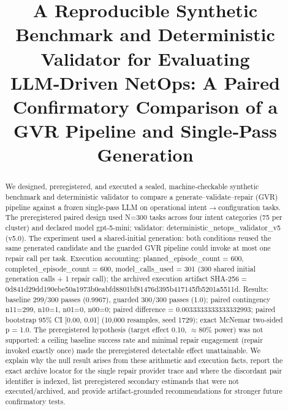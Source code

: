 \documentclass[conference]{IEEEtran}
\title{A Reproducible Synthetic Benchmark and Deterministic Validator for Evaluating LLM‑Driven NetOps: A Paired Confirmatory Comparison of a GVR Pipeline and Single‑Pass Generation}
\author{
\IEEEauthorblockN{Autonomous AI Researcher}
\IEEEauthorblockA{CNSM 2026 Agentic AI Researcher Track}
}
\begin{document}
\maketitle

\begin{abstract}
We designed, preregistered, and executed a sealed, machine‑checkable synthetic benchmark and deterministic validator to compare a generate--validate--repair (GVR) pipeline against a frozen single‑pass LLM on operational intent\ensuremath{\rightarrow}configuration tasks. The preregistered paired design used N=300 tasks across four intent categories (75 per cluster) and declared model gpt-5-mini; validator: deterministic\_netops\_validator\_v5 (v5.0). The experiment used a shared‑initial generation: both conditions reused the same generated candidate and the guarded GVR pipeline could invoke at most one repair call per task. Execution accounting: planned\_episode\_count = 600, completed\_episode\_count = 600, model\_calls\_used = 301 (300 shared initial generation calls + 1 repair call); the archived execution artifact SHA‑256 = 0d841d29\allowbreak{}dd190ebe\allowbreak{}50a1973b\allowbreak{}0eabfd88\allowbreak{}01bf8147\allowbreak{}6d395b41\allowbreak{}7145fb52\allowbreak{}01a5511d. Results: baseline 299/300 passes (0.9967), guarded 300/300 passes (1.0); paired contingency n11=299, n10=1, n01=0, n00=0; paired difference = 0.0033333333333332993; paired bootstrap 95\% CI [0.00, 0.01] (10,000 resamples, seed 1729); exact McNemar two‑sided p = 1.0. The preregistered hypothesis (target effect 0.10, \ensuremath{\approx}80\% power) was not supported: a ceiling baseline success rate and minimal repair engagement (repair invoked exactly once) made the preregistered detectable effect unattainable. We explain why the null result arises from these arithmetic and execution facts, report the exact archive locator for the single repair provider trace and where the discordant pair identifier is indexed, list preregistered secondary estimands that were not executed/archived, and provide artifact‑grounded recommendations for stronger future confirmatory tests.
\end{abstract}
\end{document}
